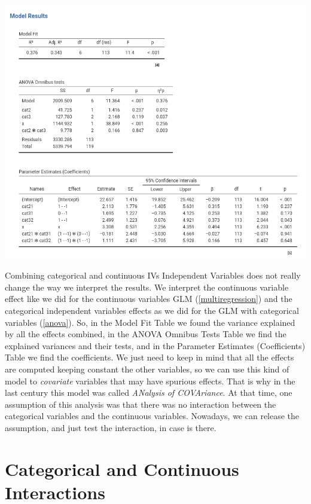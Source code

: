 \documentclass[
]{book}
\begin{document}
\includegraphics[width=11.03in]{bookletpics/2_ancova_output1}

Combining categorical and continuous {IVs {Independent Variables} } does not really change the way we interpret the results. We interpret the continuous variable effect like we did for the continuous variables GLM (\ref{multiregression}) and the categorical independent variables effects as we did for the GLM with categorical variables (\ref{anova}). So, in the {Model Fit} Table we found the variance explained by all the effects combined, in the {ANOVA Omnibus Tests} Table we find the explained variances and their tests, and in the {Parameter Estimates (Coefficients)} Table we find the coefficients. We just need to keep in mind that all the effects are computed keeping constant the other variables, so we can use this kind of model to \emph{covariate} variables that may have spurious effects. That is why in the last century this model was called \emph{ANalysis of COVAriance}. At that time, one assumption of this analysis was that there was no interaction between the categorical variables and the continuous variables. Nowadays, we can release the assumption, and just test the interaction, in case is there.

\hypertarget{moderation2}{%
\section{Categorical and Continuous Interactions}\label{moderation2}}
\end{document}
